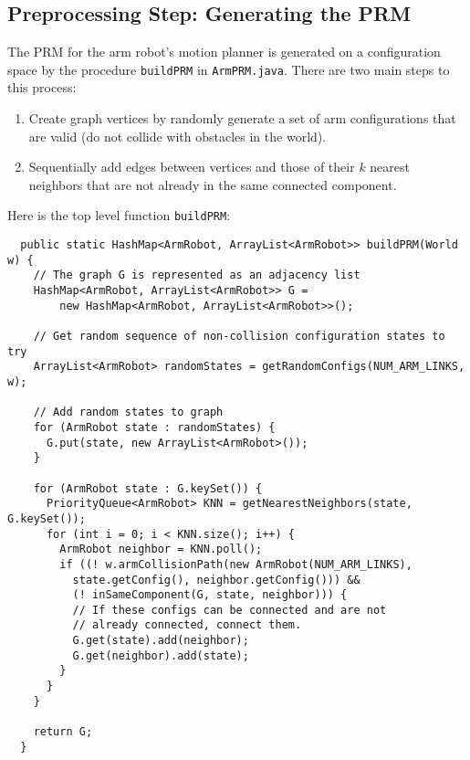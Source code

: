 \documentclass{article}
\begin{document}
\subsection{Preprocessing Step: Generating the PRM}

The PRM for the arm robot's motion planner is generated on a configuration space by the procedure \verb`buildPRM` in \verb`ArmPRM.java`. There are two main steps to this process:

\begin{enumerate}
\item Create graph vertices by randomly generate a set of arm configurations that are valid (do not collide with obstacles in the world).
\item Sequentially add edges between vertices and those of their $k$ nearest neighbors that are not already in the same connected component.
\end{enumerate}

Here is the top level function \verb`buildPRM`:

\vspace{5mm}

\begin{lstlisting}
  public static HashMap<ArmRobot, ArrayList<ArmRobot>> buildPRM(World w) {
    // The graph G is represented as an adjacency list
    HashMap<ArmRobot, ArrayList<ArmRobot>> G = 
        new HashMap<ArmRobot, ArrayList<ArmRobot>>();
    
    // Get random sequence of non-collision configuration states to try
    ArrayList<ArmRobot> randomStates = getRandomConfigs(NUM_ARM_LINKS, w);
    
    // Add random states to graph
    for (ArmRobot state : randomStates) {
      G.put(state, new ArrayList<ArmRobot>());
    }
    
    for (ArmRobot state : G.keySet()) {
      PriorityQueue<ArmRobot> KNN = getNearestNeighbors(state, G.keySet());
      for (int i = 0; i < KNN.size(); i++) {
        ArmRobot neighbor = KNN.poll();
        if ((! w.armCollisionPath(new ArmRobot(NUM_ARM_LINKS), 
          state.getConfig(), neighbor.getConfig())) && 
          (! inSameComponent(G, state, neighbor))) {
          // If these configs can be connected and are not
          // already connected, connect them.
          G.get(state).add(neighbor);
          G.get(neighbor).add(state);
        }
      }
    }
    
    return G;
  }
\end{lstlisting}
\end{document}
